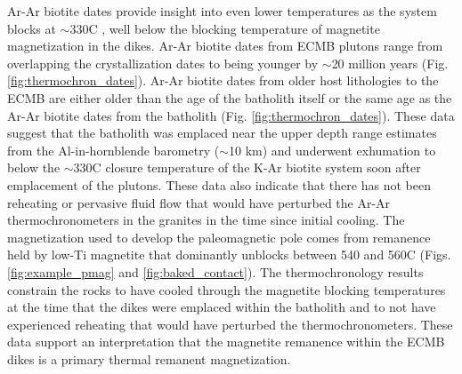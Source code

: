 \documentclass[draft]{agujournal2019}
\begin{document}
Ar-Ar biotite dates provide insight into even lower temperatures as the system blocks at $\sim$330\textdegree C \cite{Grove1996a}, well below the blocking temperature of magnetite magnetization in the dikes. Ar-Ar biotite dates from ECMB plutons range from overlapping the crystallization dates to being younger by $\sim$20 million years (Fig. \ref{fig:thermochron_dates}). Ar-Ar biotite dates from older host lithologies to the ECMB are either older than the age of the batholith itself or the same age as the Ar-Ar biotite dates from the batholith (Fig. \ref{fig:thermochron_dates}). These data suggest that the batholith was emplaced near the upper depth range estimates from the Al-in-hornblende barometry ($\sim$10 km) and underwent exhumation to below the $\sim$330\textdegree C closure temperature of the K-Ar biotite system soon after emplacement of the plutons. These data also indicate that there has not been reheating or pervasive fluid flow that would have perturbed the Ar-Ar thermochronometers in the granites in the time since initial cooling. The magnetization used to develop the paleomagnetic pole comes from remanence held by low-Ti magnetite that dominantly unblocks between 540 and 560\textdegree C (Figs. \ref{fig:example_pmag} and \ref{fig:baked_contact}). The thermochronology results constrain the rocks to have cooled through the magnetite blocking temperatures at the time that the dikes were emplaced within the batholith and to not have experienced reheating that would have perturbed the thermochronometers. These data support an interpretation that the magnetite remanence within the ECMB dikes is a primary thermal remanent magnetization.
\end{document}
